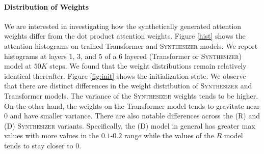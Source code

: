 \documentclass{article}
\begin{document}
\paragraph{Distribution of Weights} We are interested in investigating how the synthetically generated attention weights differ from the dot product attention weights. Figure \ref{hist} shows the attention histograms on trained Transformer and \textsc{Synthesizer} models. We report histograms at layers $1$, $3$, and $5$ of a 6 layered (Transformer or \textsc{Synthesizer}) model at $50K$ steps. We found that the weight distributions remain relatively identical thereafter. Figure \ref{fig:init} shows the initialization state. We observe that there are distinct differences in the weight distribution of \textsc{Synthesizer} and Transformer models. The variance of the \textsc{Synthesizer} weights tends to be higher. On the other hand, the weights on the Transformer model tends to gravitate near $0$ and have smaller variance. There are also notable differences across the (R) and (D) \textsc{Synthesizer} variants. Specifically, the (D) model in general has greater max values with more values in the $0.1$-$0.2$ range while the values of the $R$ model tends to stay closer to $0$.
\end{document}
